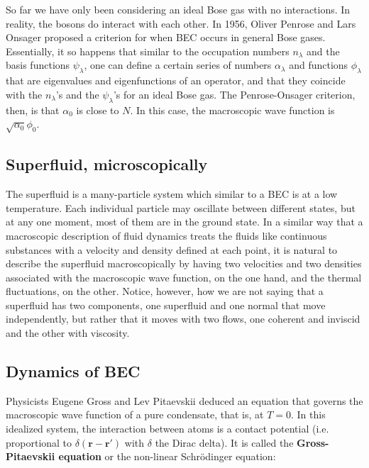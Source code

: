 \documentclass{article}
\begin{document}
So far we have only been considering an ideal Bose gas with no interactions.  In reality, the bosons do interact with each other.  In 1956, Oliver Penrose and Lars Onsager proposed a criterion for when BEC occurs in general Bose gases.  Essentially, it so happens that similar to the occupation numbers $n_\lambda$ and the basis functions $\psi_\lambda$, one can define a certain series of numbers $\alpha_\lambda$ and functions $\phi_\lambda$ that are eigenvalues and eigenfunctions of an operator, and that they coincide with the $n_\lambda$'s and the $\psi_\lambda$'s for an ideal Bose gas.  The Penrose-Onsager criterion, then, is that $\alpha_0$ is close to $N$.  In this case, the macroscopic wave function is $\sqrt{\alpha_0} \phi_0$. 

\subsection{Superfluid, microscopically}

The superfluid is a many-particle system which similar to a BEC is at a low temperature.  Each individual particle may oscillate between different states, but at any one moment, most of them are in the ground state.  In a similar way that a macroscopic description of fluid dynamics treats the fluids like continuous substances with a velocity and density defined at each point, it is natural to describe the superfluid macroscopically by having two velocities and two densities associated with the macroscopic wave function, on the one hand, and the thermal fluctuations, on the other.  Notice, however, how we are not saying that a superfluid has two components, one superfluid and one normal that move independently, but rather that it moves with two flows, one coherent and inviscid and the other with viscosity.

\subsection{Dynamics of BEC}

Physicists Eugene Gross and Lev Pitaevskii deduced an equation that governs the macroscopic wave function of a pure condensate, that is, at $T = 0$.  In this idealized system, the interaction between atoms is a contact potential (i.e. proportional to $\delta(\mathbf{r}-\mathbf{r}')$ with $\delta$ the Dirac delta). It is called the \textbf{Gross-Pitaevskii equation} or the non-linear Schrödinger equation:
\end{document}
